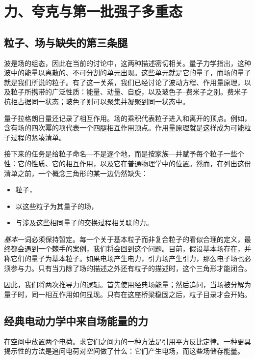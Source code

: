 \chapter{力、夸克与第一批强子多重态}

\section{粒子、场与缺失的第三条腿}

波是场的组态，因此在当前的讨论中，这两种描述密切相关。量子力学指出，这种波中的能量以离散的、不可分割的单元出现。这些单元就是它的量子，而场的量子就是我们所说的粒子。有了这一关系，我们已经讨论了波动方程、作用量原理，以及粒子所携带的广泛性质：能量、动量、自旋，以及玻色子--费米子之别。费米子抗拒占据同一状态；玻色子则可以聚集并凝聚到同一状态中。

量子拉格朗日量还记录了相互作用。场的乘积代表粒子进入和离开的顶点。例如，含有场的四次幂的项代表一个四腿相互作用顶点。作用量原理就是这样成为可能粒子过程的紧凑清单。

接下来的任务是给粒子命名---不是逐个地，而是按家族---并赋予每个粒子一些个性：它的性质、它的相互作用，以及它在普通物理学中的位置。然而，在列出这份清单之前，一个概念三角形的某一边仍然缺失：
\begin{itemize}
\item 粒子，
\item 以这些粒子为其量子的场，
\item 与涉及这些相同量子的交换过程相关联的力。
\end{itemize}

\emph{基本}一词必须保持暂定。每一个关于基本粒子而非复合粒子的看似合理的定义，最终都会遇到一个棘手的案例，我们将会回到这个问题。目前，假设基本场存在，并称它们的量子为基本粒子。如果电场产生电力，引力场产生引力，那么电子场也必须参与力。只有当力除了场的描述之外还有粒子的描述时，这个三角形才能闭合。

因此，我们将两次推导力的逻辑。首先使用经典场能量；然后追问，当场被分解为量子时，同一相互作用如何显现。只有在这座桥梁稳固之后，粒子目录才会开始。

\section{经典电动力学中来自场能量的力}

在空间中放置两个电荷。求它们之间力的一种方法是引用平方反比定律。一种更具揭示性的方法是追问电荷对空间做了什么：它们产生电场，而这些场储存能量。


